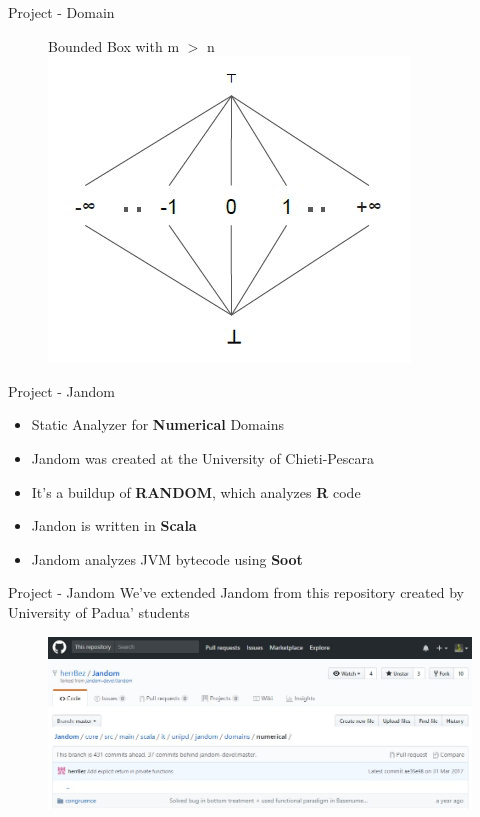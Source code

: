 \documentclass{beamer}
\begin{document}
	\begin{frame}{Project - Domain}
		\begin{figure}
			Bounded Box with m $>$ n
	\includegraphics[scale=0.8]{images/constant.jpg}
\end{figure}

\end{frame}

	\begin{frame}{Project - Jandom}
		\begin{itemize}
			\item Static Analyzer for \textbf{Numerical} Domains
			\item Jandom was created at the University of Chieti-Pescara
			\item It's a buildup of \textbf{RANDOM}, which analyzes \textbf{R} code
			\item Jandon is written in \textbf{Scala}
			\item Jandom analyzes JVM bytecode using \textbf{Soot}
		\end{itemize}
	\end{frame}

	\begin{frame}{Project - Jandom}
		We've extended Jandom from this repository created by University of Padua' students
		\begin{figure}[c]
			\includegraphics[scale=0.4]{images/repo.jpg}
		\end{figure}
	\end{frame}
\end{document}
